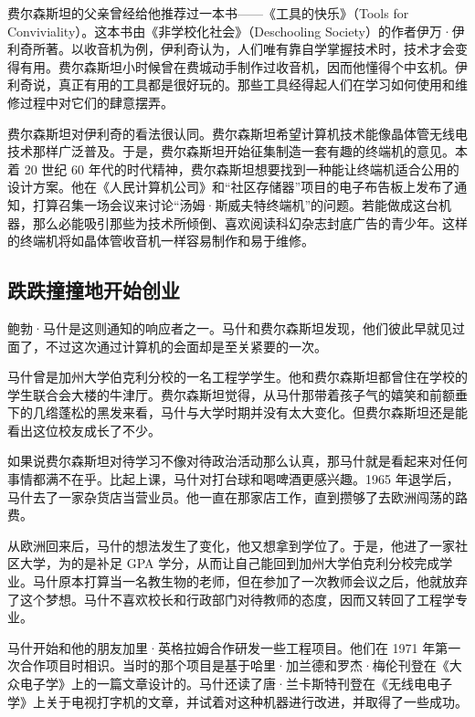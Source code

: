 \documentclass[12pt,UTF8]{ctexbook}
\begin{document}
费尔森斯坦的父亲曾经给他推荐过一本书——《工具的快乐》（Tools for Conviviality）。这本书由《非学校化社会》（Deschooling Society）的作者伊万·伊利奇所著。以收音机为例，伊利奇认为，人们唯有靠自学掌握技术时，技术才会变得有用。费尔森斯坦小时候曾在费城动手制作过收音机，因而他懂得个中玄机。伊利奇说，真正有用的工具都是很好玩的。那些工具经得起人们在学习如何使用和维修过程中对它们的肆意摆弄。

费尔森斯坦对伊利奇的看法很认同。费尔森斯坦希望计算机技术能像晶体管无线电技术那样广泛普及。于是，费尔森斯坦开始征集制造一套有趣的终端机的意见。本着 20 世纪 60 年代的时代精神，费尔森斯坦想要找到一种能让终端机适合公用的设计方案。他在《人民计算机公司》和“社区存储器”项目的电子布告板上发布了通知，打算召集一场会议来讨论“汤姆·斯威夫特终端机”的问题。若能做成这台机器，那么必能吸引那些为技术所倾倒、喜欢阅读科幻杂志封底广告的青少年。这样的终端机将如晶体管收音机一样容易制作和易于维修。





\subsection{跌跌撞撞地开始创业}


鲍勃·马什是这则通知的响应者之一。马什和费尔森斯坦发现，他们彼此早就见过面了，不过这次通过计算机的会面却是至关紧要的一次。

马什曾是加州大学伯克利分校的一名工程学学生。他和费尔森斯坦都曾住在学校的学生联合会大楼的牛津厅。费尔森斯坦觉得，从马什那带着孩子气的嬉笑和前额垂下的几绺蓬松的黑发来看，马什与大学时期并没有太大变化。但费尔森斯坦还是能看出这位校友成长了不少。

如果说费尔森斯坦对待学习不像对待政治活动那么认真，那马什就是看起来对任何事情都满不在乎。比起上课，马什对打台球和喝啤酒更感兴趣。1965 年退学后，马什去了一家杂货店当营业员。他一直在那家店工作，直到攒够了去欧洲闯荡的路费。

从欧洲回来后，马什的想法发生了变化，他又想拿到学位了。于是，他进了一家社区大学，为的是补足 GPA 学分，从而让自己能回到加州大学伯克利分校完成学业。马什原本打算当一名教生物的老师，但在参加了一次教师会议之后，他就放弃了这个梦想。马什不喜欢校长和行政部门对待教师的态度，因而又转回了工程学专业。

马什开始和他的朋友加里·英格拉姆合作研发一些工程项目。他们在 1971 年第一次合作项目时相识。当时的那个项目是基于哈里·加兰德和罗杰·梅伦刊登在《大众电子学》上的一篇文章设计的。马什还读了唐·兰卡斯特刊登在《无线电电子学》上关于电视打字机的文章，并试着对这种机器进行改进，并取得了一些成功。
\end{document}
